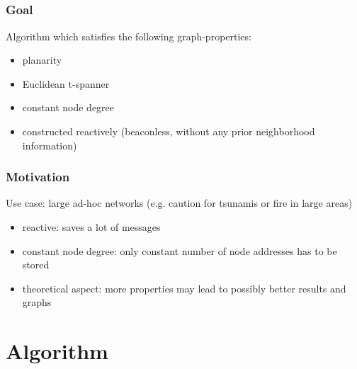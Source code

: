 \documentclass[compress]{beamer}
\begin{document}
\subsection{}
\begin{frame}
\frametitle{Goal}
Algorithm which satisfies the following graph-properties:
\begin{itemize}
\item planarity
\item Euclidean t-spanner
\item constant node degree
\item constructed reactively (beaconless, without any prior neighborhood information)
\end{itemize}
\end{frame}


\begin{frame}
\frametitle{Motivation}
Use case: large ad-hoc networks (e.g. caution for tsunamis or fire in large areas)
\begin{itemize}
\item reactive: saves a lot of messages
\item constant node degree: only constant number of node addresses has to be stored
\item theoretical aspect: more properties may lead to possibly better results and graphs
\end{itemize}
\end{frame}

\section{Algorithm}
\end{document}
